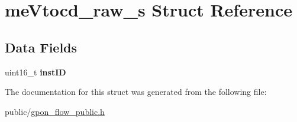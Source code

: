 \hypertarget{structmeVtocd__raw__s}{}\section{me\+Vtocd\+\_\+raw\+\_\+s Struct Reference}
\label{structmeVtocd__raw__s}
\subsection*{Data Fields}
\begin{DoxyCompactItemize}
\item 
\mbox{\label{structmeVtocd__raw__s_a0a752c7a41ed29bf0e8ecaab9333cc08}} 
uint16\+\_\+t {\bfseries inst\+ID}
\end{DoxyCompactItemize}


The documentation for this struct was generated from the following file\+:\begin{DoxyCompactItemize}
\item 
public/\hyperlink{gpon__flow__public_8h}{gpon\+\_\+flow\+\_\+public.\+h}\end{DoxyCompactItemize}
